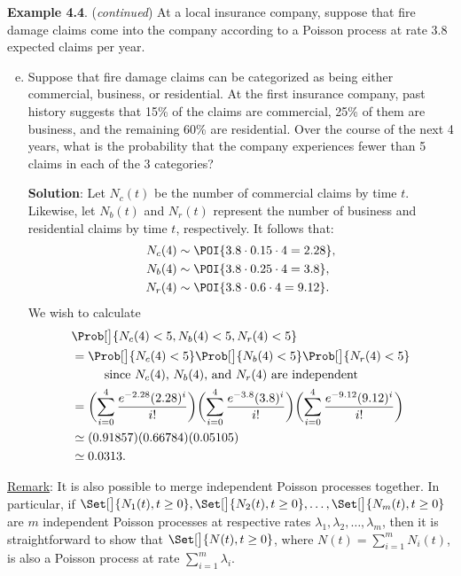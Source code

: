 \begin{Example}
    \textbf{Example 4.4}. (\emph{continued}) At a local insurance company, suppose that fire damage claims
    come into the company according to a Poisson process at rate 3.8 expected claims per year.
    \begin{enumerate}[(a)]
        \setcounter{enumi}{4}
        \item Suppose that fire damage claims can be categorized as being either commercial, business,
              or residential. At the first insurance company, past history suggests that 15\% of the claims are
              commercial, 25\% of them are business, and the remaining 60\% are residential. Over the
              course of the next 4 years, what is the probability that the company experiences fewer than 5
              claims in each of the 3 categories?

              \textbf{Solution}: Let $ N_c(t) $ be the number of commercial claims
              by time $ t $. Likewise, let $ N_b(t) $ and $ N_r(t) $ represent
              the number of business and residential claims by time $ t $,
              respectively. It follows that:
              \begin{align*}
                  N_c(4) & \sim \POI{3.8\cdot 0.15\cdot 4=2.28}, \\
                  N_b(4) & \sim \POI{3.8\cdot 0.25\cdot 4=3.8},  \\
                  N_r(4) & \sim \POI{3.8\cdot 0.6\cdot 4=9.12}.
              \end{align*}
              We wish to calculate
              \begin{align*}
                   & \Prob[\big]{N_c(4)<5,N_b(4)<5,N_r(4)<5}                                                  \\
                   & =\Prob[\big]{N_c(4)<5}\Prob[\big]{N_b(4)<5}\Prob[\big]{N_r(4)<5}                         \\
                   & \phantom{{}={}}\quad\text{ since $ N_c(4) $, $ N_b(4) $, and $ N_r(4) $ are independent} \\
                   & =\biggl(\sum_{i=0}^{4}\frac{e^{-2.28}(2.28)^i}{i!}\biggr)
                  \biggl(\sum_{i=0}^{4}\frac{e^{-3.8}(3.8)^i}{i!}\biggr)
                  \biggl(\sum_{i=0}^{4}\frac{e^{-9.12}(9.12)^i}{i!}\biggr)                                    \\
                   & \simeq (0.91857)(0.66784)(0.05105)                                                       \\
                   & \simeq 0.0313.
              \end{align*}
    \end{enumerate}
\end{Example}
\underline{Remark}: It is also possible to merge independent Poisson processes together. In particular, if
$ \Set[\big]{N_1(t),t\ge 0},\Set[\big]{N_2(t),t\ge 0},\ldots,\Set[\big]{N_m(t),t\ge 0} $
are $ m $ independent Poisson processes at respective rates $ \lambda_1,\lambda_2,\ldots,\lambda_m $,
then it is straightforward to show that $ \Set[\big]{N(t),t\ge 0} $, where
$ N(t)=\sum_{i=1}^{m}N_i(t) $, is also a Poisson process at rate $ \sum_{i=1}^{m}\lambda_i $.
